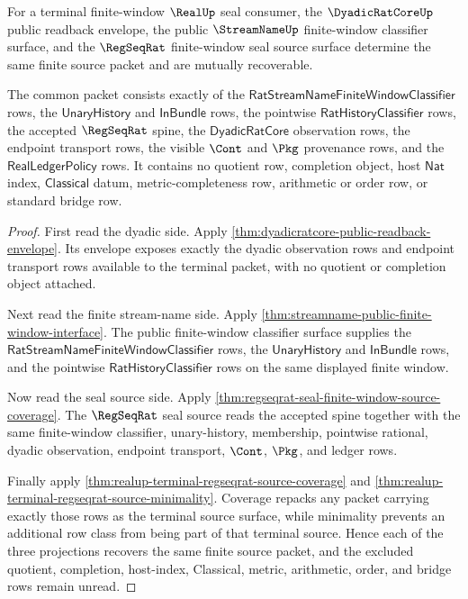 \begin{theorem}
\label{thm:dyadicratcore-streamname-regseqrat-observation-triangle}
For a terminal finite-window $\RealUp$ seal consumer, the
$\DyadicRatCoreUp$ public readback envelope, the public $\StreamNameUp$
finite-window classifier surface, and the $\RegSeqRat$ finite-window seal
source surface determine the same finite source packet and are mutually
recoverable.

The common packet consists exactly of the
$\mathsf{RatStreamNameFiniteWindowClassifier}$ rows, the
$\mathsf{UnaryHistory}$ and $\mathsf{InBundle}$ rows, the pointwise
$\mathsf{RatHistoryClassifier}$ rows, the accepted $\RegSeqRat$ spine, the
$\mathsf{DyadicRatCore}$ observation rows, the endpoint transport rows, the
visible $\Cont$ and $\Pkg$ provenance rows, and the
$\mathsf{RealLedgerPolicy}$ rows. It contains no quotient row, completion
object, host $\mathsf{Nat}$ index, $\mathsf{Classical}$ datum,
metric-completeness row, arithmetic or order row, or standard bridge row.
\end{theorem}
\begin{proof}
First read the dyadic side. Apply
\autoref{thm:dyadicratcore-public-readback-envelope}. Its envelope exposes
exactly the dyadic observation rows and endpoint transport rows available to
the terminal packet, with no quotient or completion object attached.

Next read the finite stream-name side. Apply
\autoref{thm:streamname-public-finite-window-interface}. The public
finite-window classifier surface supplies the
$\mathsf{RatStreamNameFiniteWindowClassifier}$ rows, the
$\mathsf{UnaryHistory}$ and $\mathsf{InBundle}$ rows, and the pointwise
$\mathsf{RatHistoryClassifier}$ rows on the same displayed finite window.

Now read the seal source side. Apply
\autoref{thm:regseqrat-seal-finite-window-source-coverage}. The
$\RegSeqRat$ seal source reads the accepted spine together with the same
finite-window classifier, unary-history, membership, pointwise rational,
dyadic observation, endpoint transport, $\Cont$, $\Pkg$, and ledger rows.

Finally apply \autoref{thm:realup-terminal-regseqrat-source-coverage} and
\autoref{thm:realup-terminal-regseqrat-source-minimality}. Coverage repacks
any packet carrying exactly those rows as the terminal source surface, while
minimality prevents an additional row class from being part of that terminal
source. Hence each of the three projections recovers the same finite source
packet, and the excluded quotient, completion, host-index, Classical, metric,
arithmetic, order, and bridge rows remain unread.
\end{proof}

